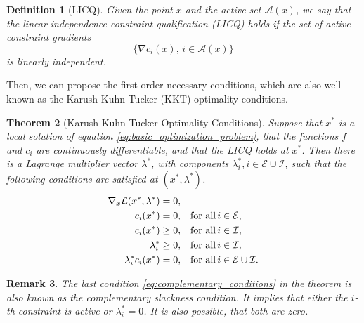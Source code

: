 \documentclass{scrreprt}
\newtheorem{theorem}{Theorem}[chapter]
\newtheorem{definition}[theorem]{Definition}
\newtheorem{remark}[theorem]{Remark}
\begin{document}
            \begin{definition}[LICQ]
                \label{def:licq}
                Given the point $x$ and the active set $\mathcal{A}(x)$, we say that the linear independence constraint qualification (LICQ) holds if the set of active constraint gradients
                    $$
                        \{ \nabla c_{i}(x), \, i \in \mathcal{A}(x) \}
                    $$
                is linearly independent.
            \end{definition}

            Then, we can propose the first-order necessary conditions, which are also well known as the Karush-Kuhn-Tucker (KKT) optimality conditions.

            \begin{theorem}[Karush-Kuhn-Tucker Optimality Conditions]
            \label{the:kkt_conditions}
                Suppose that $x^{\ast}$ is a local solution of equation \ref{eq:basic_optimization_problem}, that the
                functions $f$ and $c_{i}$ are continuously differentiable, and that the LICQ holds at $x^{\ast}$. Then there is a Lagrange multiplier vector $\lambda^{\ast}$, with components $\lambda_{i}^{\ast}, i \in \mathcal{E} \cup \mathcal{I}$, such that the following conditions are satisfied at $(x^{\ast}, \lambda^{\ast})$.
                \begin{subequations}
                    \begin{align}
                        \nabla_{x}\mathcal{L}(x^{\ast}, \lambda^{\ast}) &= 0, \label{eq:stationarity} \\
                        c_{i}(x^{\ast}) &= 0, \,\,\,\,\, \textnormal{for all} \, i \in \mathcal{E}, \\
                        c_{i}(x^{\ast}) &\ge 0, \,\,\,\,\, \textnormal{for all} \, i \in \mathcal{I}, \\
                        \lambda_{i}^{\ast} &\ge 0, \,\,\,\,\, \textnormal{for all} \, i \in \mathcal{I}, \\
                        \lambda_{i}^{\ast}c_{i}(x^{\ast}) &= 0, \,\,\,\,\, \textnormal{for all} \, i \in \mathcal{E} \cup \mathcal{I}.\label{eq:complementary_conditions}
                    \end{align}
                    \label{eq:kkt_conditions}
                \end{subequations}
            \end{theorem}

            \begin{remark}
                The last condition \ref{eq:complementary_conditions} in the theorem is also known as the complementary slackness condition. It implies that either the $i$-th constraint is active or $\lambda_{i}^{\ast} = 0$. It is also possible, that both are zero.
            \end{remark}
\end{document}
